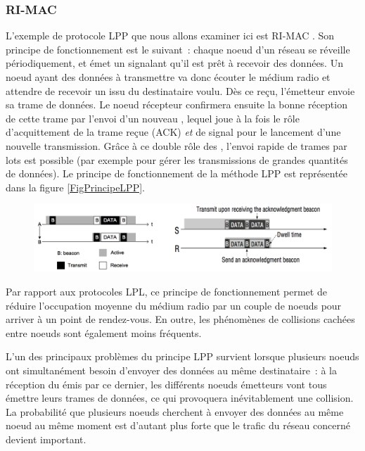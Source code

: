 \subsubsection{RI-MAC}
\label{ParRIMAC}

L'exemple de protocole LPP que nous allons examiner ici est RI-MAC
\cite{RIMAC}. Son principe de fonctionnement est le suivant~: chaque
noeud d'un réseau se réveille périodiquement, et émet un 
signalant qu'il est prêt à recevoir des données. Un noeud ayant des données
à transmettre va donc écouter le médium radio et attendre de recevoir
un  issu du destinataire voulu. Dès ce 
reçu, l'émetteur envoie sa trame de données. Le noeud récepteur confirmera
ensuite la bonne réception de cette trame par l'envoi d'un nouveau
, lequel joue à la fois le rôle d'acquittement de la trame
reçue (ACK) \emph{et} de signal pour le lancement d'une nouvelle transmission.
Grâce à ce double rôle des , l'envoi rapide de trames
par lots est possible (par exemple pour gérer les transmissions de grandes
quantités de données). Le principe de fonctionnement de la méthode LPP
est représentée dans la figure \vref{FigPrincipeLPP}.

\begin{figure}[!hbt]
\centering
\includegraphics[width=14cm]{images/ch3-lpp.png}
\label{FigPrincipeLPP}
\end{figure}

Par rapport aux protocoles LPL, ce principe de fonctionnement permet
de réduire l'occupation moyenne du médium radio par un couple de
noeuds pour arriver à un point de rendez-vous.
En outre, les phénomènes de collisions cachées entre noeuds sont
également moins fréquents.

L'un des principaux problèmes du principe LPP survient lorsque
plusieurs noeuds ont simultanément besoin d'envoyer des données
au même destinataire~: à la réception du  émis par ce
dernier, les différents noeuds émetteurs vont tous émettre leurs
trames de données, ce qui provoquera inévitablement une collision.
La probabilité que plusieurs noeuds cherchent à envoyer des données
au même noeud au même moment est d'autant plus forte que le trafic
du réseau concerné devient important.

